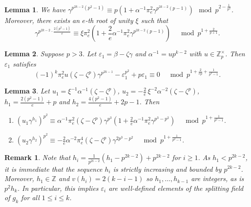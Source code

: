 \documentclass[10pt,a4paper]{amsart}
\newtheorem{lemma}{Lemma}
\newtheorem{remark}{Remark}
\newcommand{\Z}{\mathbb{Z}}
\begin{document}
\begin{lemma}\label{lemma: congruences powers of gamma}
We have $\gamma^{p^{2k-2}(p^2-1)} \equiv p(1 + \alpha^{-1} \pi_e^2 \gamma^{p^{2k-2}(p-1)}) \mod p^{2-\frac{1}{p^2}}$. Moreover, there exists an $e$-th root of unity $\xi$ such that
\[
\gamma^{p^{2k-2} \cdot \frac{2(p^2-1)}{e}} \equiv \xi \pi_e^2 \left(1 + \frac{2}{e}\alpha^{-1}\pi_e^2 \gamma^{p^{2k-2}(p-1)} \right) \quad \bmod{p^{1+ \frac{2}{p+1}}}.
\]
\end{lemma}

\begin{lemma}\label{lemma: epsilon1}
Suppose $p > 3$. Let $\varepsilon_1=\beta-\zeta\gamma$ and $\alpha^{-1} = u p^{k-2}$ with $u \in \Z_p^\times$. Then $\varepsilon_1$ satisfies
\begin{equation}\label{eq: lemma epsilon1}
     (-1)^k\pi_e^2u(\zeta-\zeta^p)\gamma^{p^{2k-1}} - \varepsilon_1^{p^2} + p\varepsilon_1 \equiv 0 \quad \bmod{p^{1+\frac{2}{ep}+\frac{1}{p^2-1}}}. 
\end{equation}
\end{lemma}

\begin{lemma}\label{lemma: u1 and u2}
Let $u_1=\xi^{-1}\alpha^{-1}(\zeta-\zeta^p)$, $u_2=-\frac{2}{e} \,\xi^{-2}\alpha^{-2}(\zeta-\zeta^p)$, $h_1=\frac{2(p^2-1)}{e}+p$ and $h_2=\frac{4(p^2-1)}{e}+2p-1$. 
Then
\begin{enumerate}
    \item $(u_1\gamma^{h_1})^{p^2} \equiv \alpha^{-1}\pi_e^2(\zeta-\zeta^p)\gamma^{p^3}\left(1+\tfrac{2}{e}\alpha^{-1}\pi_e^2\gamma^{p^3-p^2}\right) \quad \bmod{p^{1+\frac{1}{p^2-1}}}.$
    \item $(u_2\gamma^{h_2})^{p^2} \equiv -\frac{2}{e}\alpha^{-2}\pi_e^4(\zeta-\zeta^p)\gamma^{2p^3-p^2} \quad \bmod{p^{1+\frac{1}{p^2-1}}}.$
\end{enumerate}
\end{lemma}

\begin{remark}\label{rmk: h_i inequalities}
    Note that $h_i=\frac{1}{p^{2i-2}}(h_1-p^{2k-2}) + p^{2k-2}$ for $i \geq 1$. As $h_1 < p^{2k-2}$, it is immediate that the sequence $h_i$ is strictly increasing and bounded by $p^{2k-2}$. Moreover, $h_1 \in \Z$ and $v(h_i)=2(k-i-1)$ so $h_1,\ldots,h_{k-1}$ are integers, as is $p^2h_k$. In particular, this implies $\varepsilon_i$ are well-defined elements of the splitting field of $g_k$ for all $1 \leq i \leq k$.
\end{remark}
\end{document}
